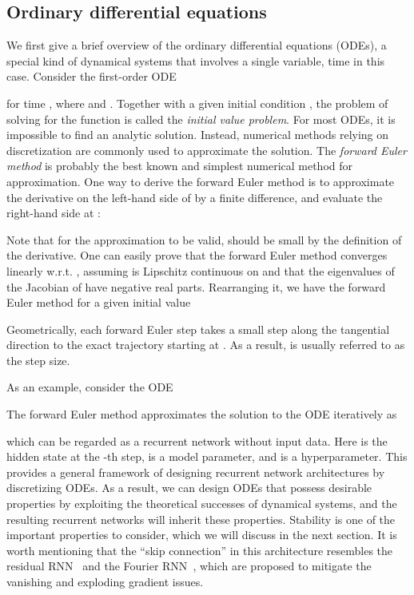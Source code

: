 \subsection{Ordinary differential equations}


We first give a brief overview of the ordinary differential equations (ODEs), a special kind of dynamical systems that involves a single variable, time  in this case.
Consider the first-order ODE

for time ,
where  and . 
Together with a given initial condition , the problem of solving for the function  is called the \textit{initial value problem}. For most ODEs, it is impossible to find an analytic solution. Instead, numerical methods relying on discretization are commonly used to approximate the solution.  
The \textit{forward Euler method} is probably the best known and simplest numerical method for approximation. 
One way to derive the forward Euler method is to approximate the derivative on the left-hand side of  by a finite difference, and evaluate the right-hand side at :

Note that for the approximation to be valid,   should be small by the definition of the derivative. One can easily prove that the forward Euler method converges linearly w.r.t. , assuming  is Lipschitz continuous on  and that the eigenvalues of the Jacobian of  have negative real parts.   
Rearranging it, we have the forward Euler method for a given initial value

Geometrically, each forward Euler step takes a small step along the tangential direction to the exact trajectory starting at .
As a result,  is usually referred to as the step size.

As an example, consider the ODE

The forward Euler method approximates the solution to the ODE iteratively as

which can be regarded as a recurrent network without input data.  Here  is the hidden state at the -th step,  is a model parameter, and  is a hyperparameter.
This provides a general framework of designing recurrent network architectures by discretizing ODEs.
As a result, we can design ODEs that possess desirable properties by exploiting the theoretical successes of dynamical systems, and the resulting recurrent networks will inherit these properties.
Stability is one of the important properties to consider, which we will discuss in the next section.
It is worth mentioning that the ``skip connection'' in this architecture resembles the residual RNN~\citep{yue2018residual} and the Fourier RNN~\citep{zhang2018learning}, which are proposed to mitigate the vanishing and exploding gradient issues.



